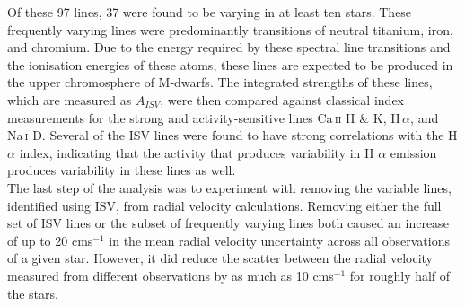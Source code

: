 Of these 97 lines, 37 were found to be varying in at least ten stars. These frequently varying lines were predominantly transitions of neutral titanium, iron, and chromium. Due to the energy required by these spectral line transitions and the ionisation energies of these atoms, these lines are expected to be produced in the upper chromosphere of M-dwarfs. The integrated strengths of these lines, which are measured as $A_{ISV}$, were then compared against classical index measurements for the strong and activity-sensitive lines Ca\,\textsc{ii} H \& K, H\,\textsc{$\alpha$}, and Na\,\textsc{i} D. Several of the ISV lines were found to have strong correlations with the H $\alpha$ index, indicating that the activity that produces variability in H $\alpha$ emission produces variability in these lines as well. \\

The last step of the analysis was to experiment with removing the variable lines, identified using ISV, from radial velocity calculations. Removing either the full set of ISV lines or the subset of frequently varying lines both caused an increase of up to 20 cms$^{-1}$ in the mean radial velocity uncertainty across all observations of a given star. However, it did reduce the scatter between the radial velocity measured from different observations by as much as 10 cms$^{-1}$ for roughly half of the stars.\\


